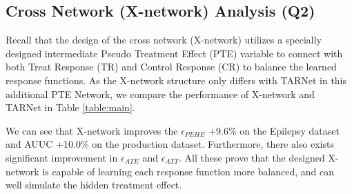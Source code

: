 \documentclass[sigconf]{acmart}
\begin{document}
\subsection{Cross Network (X-network) Analysis (Q2)}
Recall that the design of the cross network (X-network) utilizes a specially designed intermediate Pseudo Treatment Effect (PTE) variable to connect with both Treat Response (TR) and Control Response (CR) to balance the learned response functions. As the X-network structure only differs with TARNet in this additional PTE Network, we compare the performance of X-network and TARNet in Table \ref{table:main}. 

We can see that X-network improves the $\epsilon_{PEHE}$ +9.6\% on the Epilepsy dataset and AUUC +10.0\% on the production dataset. Furthermore, there also exists significant improvement in $\epsilon_{ATE}$ and $\epsilon_{ATT}$. All these prove that the designed X-network is capable of learning each response function more balanced, and can well simulate the hidden treatment effect. 






\end{document}
